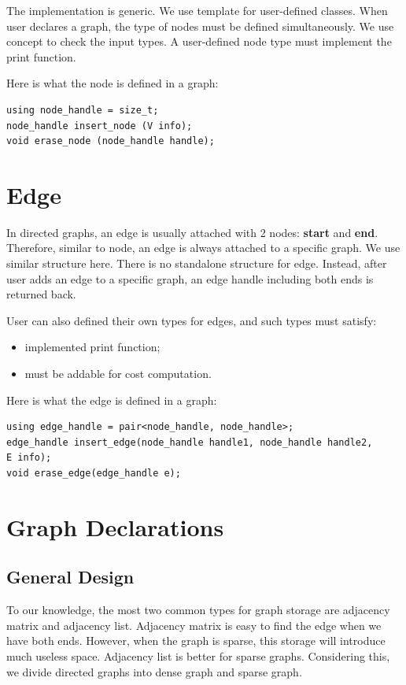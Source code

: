 \documentclass[]{article}
\begin{document}
The implementation is generic. We use template for user-defined classes. When user declares a graph, the type of nodes must be defined simultaneously. We use concept to check the input types. A user-defined node type must implement the print function.

Here is what the node is defined in a graph:

\begin{lstlisting}
using node_handle = size_t;
node_handle insert_node (V info);
void erase_node (node_handle handle);
\end{lstlisting}
\section {Edge}
In directed graphs, an edge is usually attached with 2 nodes: \textbf{start} and \textbf{end}. Therefore, similar to node, an edge is always attached to a specific graph. We use similar structure here. There is no standalone structure for edge. Instead, after user adds an edge to a specific graph, an edge handle including both ends is returned back.

User can also defined their own types for edges, and such types must satisfy:
\begin{itemize}
	\item implemented print function;
	\item must be addable for cost computation.
\end{itemize}
Here is what the edge is defined in a graph:
\begin{lstlisting}
using edge_handle = pair<node_handle, node_handle>;
edge_handle insert_edge(node_handle handle1, node_handle handle2, 
E info);
void erase_edge(edge_handle e);
\end{lstlisting}
\section{Graph Declarations}
\subsection{General Design}
To our knowledge, the most two common types for graph storage are adjacency matrix and adjacency list. Adjacency matrix is easy to find the edge when we have both ends. However, when the graph is sparse, this storage will introduce much useless space. Adjacency list is better for sparse graphs. Considering this, we divide directed graphs into dense graph and sparse graph.
\end{document}
